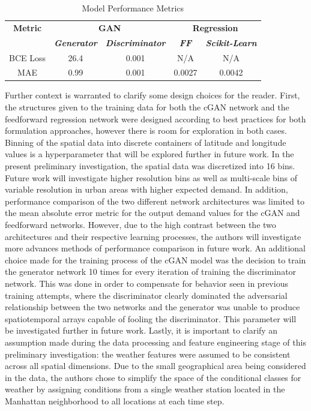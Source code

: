 \documentclass[conference]{IEEEtran}
\begin{document}
 \begin{table}[t]
  \caption{Model Performance Metrics}
  \begin{center}
  \begin{tabular}{|c|c|c|c|c|}
  \hline
  \textbf{Metric} & \multicolumn{2}{|c|}{\textbf{GAN}} & \multicolumn{2}{|c|}{\textbf{Regression}} \\
  \cline{2-5} 
  & \textbf{\textit{Generator}}& \textbf{\textit{Discriminator}} & \textbf{\textit{FF}}
  & \textbf{\textit{Scikit-Learn}}\\
  \hline
  BCE Loss & 26.4 & 0.001 & N/A & N/A \\
  \hline
  MAE & 0.99 & 0.001 & 0.0027 & 0.0042 \\
  \hline
  \end{tabular}
  \label{tab:metrics}
  \end{center}
  \end{table} 

Further context is warranted to clarify some design choices for the reader. First, the structures given to the training data for
 both the cGAN network and the feedforward regression network were designed according to best practices for both formulation approaches, 
 however there is room for exploration in both cases. Binning of the spatial data into discrete containers of latitude and 
 longitude values is a hyperparameter that will be explored further in future work. In the present preliminary investigation, 
 the spatial data was discretized into 16 bins. Future work will investigate higher resolution bins as well as multi-scale bins
  of variable resolution in urban areas with higher expected demand. In addition, performance comparison of the two different 
  network architectures was limited to the mean absolute error metric for the output demand values for the cGAN and feedforward
   networks. However, due to the high contrast between the two architectures and their respective learning processes, the authors
    will investigate more advances methods of performance comparison in future work. An additional choice made for the training 
    process of the cGAN model was the decision to train the generator network 10 times for every iteration of training the 
    discriminator network. This was done in order to compensate for behavior seen in previous training attempts, where the 
    discriminator clearly dominated the adversarial relationship between the two networks and the generator was unable to 
    produce spatiotemporal arrays capable of fooling the discriminator. This parameter will be investigated further in future 
    work. Lastly, it is important to clarify an assumption made during the data processing and feature engineering stage of 
    this preliminary investigation: the weather features were assumed to be consistent across all spatial dimensions. Due to 
    the small geographical area being considered in the data, the authors chose to simplify the space of the conditional classes
     for weather by assigning conditions from a single weather station located in the Manhattan neighborhood to all locations 
     at each time step.
\end{document}

